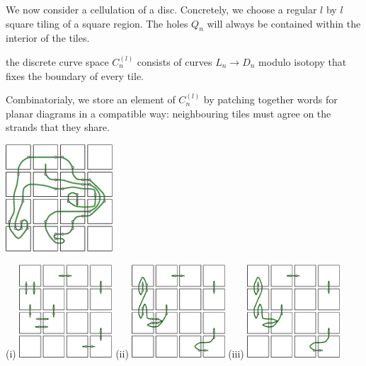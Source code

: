 \documentclass[11pt,a4paper]{article}
\begin{document}


We now consider a cellulation of a disc.
Concretely, we choose a regular $l$ by $l$ square tiling of a square region.
The holes $Q_n$ will always be contained within the interior of the
tiles.

 the discrete curve space $C_n^{(l)}$ consists of
curves $L_n\to D_n$ modulo isotopy that fixes the boundary of
every tile.

Combinatorialy, we store an element of $C_n^{(l)}$ by patching
together words for planar diagrams in a compatible way: 
neighbouring tiles must agree on the strands that they share.

\begin{center}
\includegraphics[width=0.3\textwidth]{discrete-curve.eps}
\end{center}



\begin{center}
(i)
\includegraphics[width=0.26\textwidth]{pair-create.eps}
\hskip 10pt
(ii)
\includegraphics[width=0.26\textwidth]{syndrome-1.eps}
\hskip 10pt
(iii)
\includegraphics[width=0.26\textwidth]{syndrome-2.eps}
\end{center}
\end{document}
